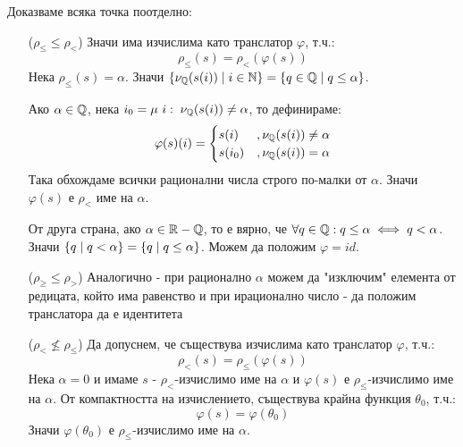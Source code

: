 \begin{solution}Доказваме всяка точка поотделно:
    \begin{itemize}
        \item[($\rho_\leq \leq \rho_<$)] Значи има изчислима като транслатор $\varphi$, т.ч.:
            \begin{equation}
                \rho_\leq(s) = \rho_<(\varphi(s))
            \end{equation}
            Нека $\rho_\leq(s) = \alpha$. Значи $\left\{\nu_{\mathbb{Q}}(s(i)) \mid i \in {\mathbb{N}}\right\} = \left\{q \in {\mathbb{Q}}\mid q \leq \alpha\right\}$.

            Ако $\alpha \in {\mathbb{Q}}$, нека $i_0 = \mu\ i:\; \nu_{\mathbb{Q}}(s(i)) \neq \alpha$, то дефинираме:
            \begin{equation}
                \varphi(s)(i) = \begin{cases}
                    s(i)   & , \nu_{\mathbb{Q}}(s(i)) \neq \alpha \\
                    s(i_0) & , \nu_{\mathbb{Q}}(s(i)) = \alpha
                \end{cases}
            \end{equation}
            Така обхождаме всички рационални числа строго по-малки от $\alpha$. Значи $\varphi(s)$ е $\rho_<$ име на $\alpha$.

            От друга страна, ако $\alpha \in {\mathbb{R}} - {\mathbb{Q}}$, то е вярно, че $\forall q \in {\mathbb{Q}}: q \leq \alpha \iff q < \alpha$. Значи $\left\{q \mid q < \alpha\right\} = \left\{q \mid q \leq \alpha\right\}$. Можем да положим $\varphi = id$.
        \item[($\rho_\geq \leq \rho_>$)] Аналогично - при рационално $\alpha$ можем да "изключим"  елемента от редицата, който има равенство и при ирационално число - да положим транслатора да е идентитета
        \item[($\rho_< \not\leq \rho_\leq$)] Да допуснем, че съществува изчислима като транслатор $\varphi$, т.ч.:
            \begin{equation}
                \rho_<(s) = \rho_\leq(\varphi(s))
            \end{equation}
            Нека $\alpha=0$ и имаме $s$ - $\rho_<$-изчислимо име на $\alpha$ и $\varphi(s)$ е $\rho_\leq$-изчислимо име на $\alpha$. От компактността на изчислението, съществува крайна функция $\theta_0$, т.ч.:
            \begin{equation}
                \varphi(s) = \varphi(\theta_0)
            \end{equation}
            Значи $\varphi(\theta_0)$ е $\rho_\leq$-изчислимо име на $\alpha$.


\end{itemize}
\end{solution}

